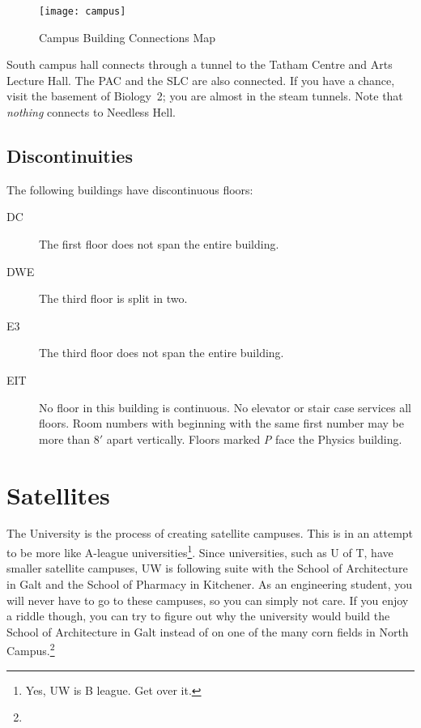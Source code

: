 \documentclass{book}
\begin{document}
\begin{figure}
\begin{center}
\texttt{[image: campus]}
\end{center}
\caption{\label{fig:map}Campus Building Connections Map}
\end{figure}

South campus hall connects through a tunnel to the Tatham Centre and Arts Lecture Hall. The PAC and the SLC are also connected. If you have a chance, visit the basement of Biology~2; you are almost in the steam tunnels. Note that \emph{nothing} connects to Needless Hell.

\subsection{Discontinuities}
The following buildings have discontinuous floors:

\begin{description}
\item[DC] The first floor does not span the entire building.
\item[DWE] The third floor is split in two.
\item[E3] The third floor does not span the entire building.
\item[EIT] No floor in this building is continuous. No elevator or stair case services all floors. Room numbers with beginning with the same first number may be more than $8'$ apart vertically. Floors marked \textsl{P} face the Physics building.
\end{description}

\section{Satellites}
The University is the process of creating satellite campuses. This is in an attempt to be more like A-league universities\footnote{Yes, UW is B league. Get over it.}. Since universities, such as U of T, have smaller satellite campuses, UW is following suite with the School of Architecture in Galt and the School of Pharmacy in Kitchener. As an engineering student, you will never have to go to these campuses, so you can simply not care. If you enjoy a riddle though, you can try to figure out why the university would build the School of Architecture in Galt instead of on one of the many corn fields in North Campus.\footnote{}
\end{document}
